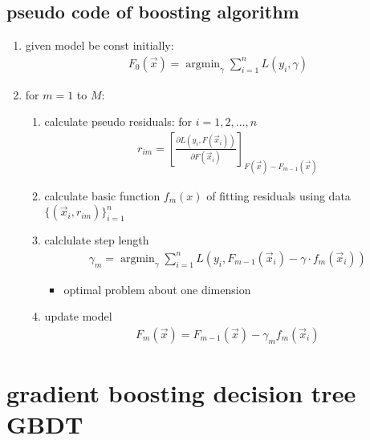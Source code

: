 \documentclass[12pt]{ctexart}%
\begin{document}
		\subsection{\quad pseudo code of boosting algorithm }
			\begin{enumerate}
				\item given model be const initially: 
					\begin{align}
						F_0(\vec{x}) = \mathop{\arg\min}_\gamma \sum_{i=1}^{n} L(y_i, \gamma)
					\end{align}
					
				\item for $m=1$ to $M$:
					\begin{enumerate}
						\item calculate pseudo residuals: for $i = 1, 2, ..., n$
							\begin{align}
								r_{im} = \left[ \frac{\partial L(y_i, F(\vec{x}_i))}{\partial F(\vec{x}_i)}\right] _{F(\vec{x}) - F_{m-1}(\vec{x})}
							\end{align}
							
						\item calculate basic function $f_m(x)$ of fitting residuals using data $\{ (\vec{x}_i, r_{im})\} _{i=1}^n$
						
						\item calclulate step length 
							\begin{align}
								\gamma_m = \mathop{\arg\min}_\gamma \sum_{i=1}^{n} L \left( y_i, F_{m-1}(\vec{x}_i) - \gamma\cdot f_m(\vec{x}_i) \right)
							\end{align}
							\begin{itemize}
								\item optimal problem about one dimension
							\end{itemize}
							
						\item update model 
							\begin{align}
								F_m(\vec{x}) = F_{m-1}(\vec{x}) - \gamma _m f_m (\vec{x}_i)
							\end{align}
					\end{enumerate}
			\end{enumerate}
	
	\section{\quad gradient boosting decision tree GBDT}
\end{document}
